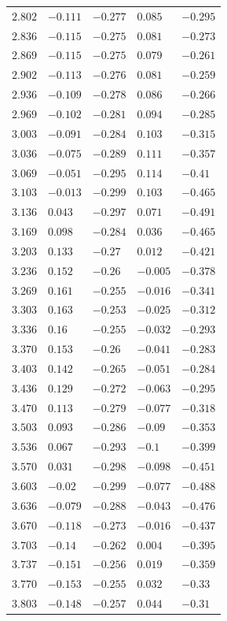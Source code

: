 \begin{center}
\begin{longtable}{lllll}
$2.802$&$-0.111$&$-0.277$&$0.085$&$-0.295$\\
$2.836$&$-0.115$&$-0.275$&$0.081$&$-0.273$\\
$2.869$&$-0.115$&$-0.275$&$0.079$&$-0.261$\\
$2.902$&$-0.113$&$-0.276$&$0.081$&$-0.259$\\
$2.936$&$-0.109$&$-0.278$&$0.086$&$-0.266$\\
$2.969$&$-0.102$&$-0.281$&$0.094$&$-0.285$\\
$3.003$&$-0.091$&$-0.284$&$0.103$&$-0.315$\\
$3.036$&$-0.075$&$-0.289$&$0.111$&$-0.357$\\
$3.069$&$-0.051$&$-0.295$&$0.114$&$-0.41$\\
$3.103$&$-0.013$&$-0.299$&$0.103$&$-0.465$\\
$3.136$&$0.043$&$-0.297$&$0.071$&$-0.491$\\
$3.169$&$0.098$&$-0.284$&$0.036$&$-0.465$\\
$3.203$&$0.133$&$-0.27$&$0.012$&$-0.421$\\
$3.236$&$0.152$&$-0.26$&$-0.005$&$-0.378$\\
$3.269$&$0.161$&$-0.255$&$-0.016$&$-0.341$\\
$3.303$&$0.163$&$-0.253$&$-0.025$&$-0.312$\\
$3.336$&$0.16$&$-0.255$&$-0.032$&$-0.293$\\
$3.370$&$0.153$&$-0.26$&$-0.041$&$-0.283$\\
$3.403$&$0.142$&$-0.265$&$-0.051$&$-0.284$\\
$3.436$&$0.129$&$-0.272$&$-0.063$&$-0.295$\\
$3.470$&$0.113$&$-0.279$&$-0.077$&$-0.318$\\
$3.503$&$0.093$&$-0.286$&$-0.09$&$-0.353$\\
$3.536$&$0.067$&$-0.293$&$-0.1$&$-0.399$\\
$3.570$&$0.031$&$-0.298$&$-0.098$&$-0.451$\\
$3.603$&$-0.02$&$-0.299$&$-0.077$&$-0.488$\\
$3.636$&$-0.079$&$-0.288$&$-0.043$&$-0.476$\\
$3.670$&$-0.118$&$-0.273$&$-0.016$&$-0.437$\\
$3.703$&$-0.14$&$-0.262$&$0.004$&$-0.395$\\
$3.737$&$-0.151$&$-0.256$&$0.019$&$-0.359$\\
$3.770$&$-0.153$&$-0.255$&$0.032$&$-0.33$\\
$3.803$&$-0.148$&$-0.257$&$0.044$&$-0.31$\\

\end{longtable}
\end{center}
